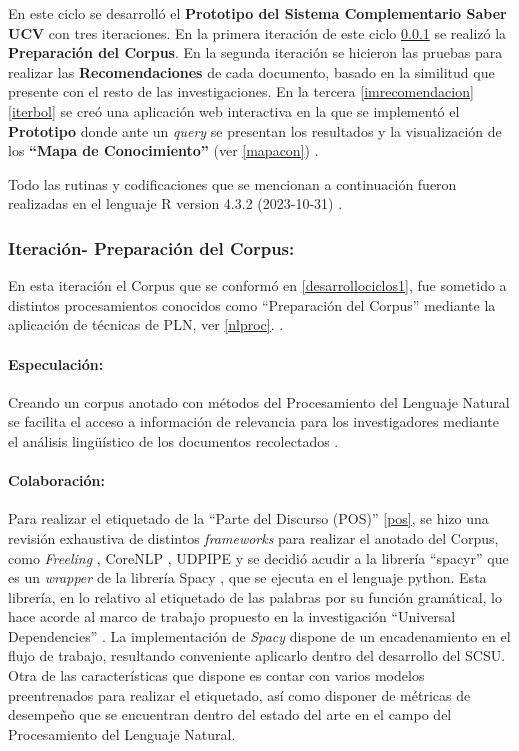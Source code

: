 \documentclass[
  12pt,
  openany]{book}
\begin{document}
En este ciclo se desarrolló el \textbf{Prototipo del Sistema Complementario Saber UCV} con tres iteraciones. En la primera iteración de este ciclo \ref{iternlp} se realizó la \textbf{Preparación del Corpus}. En la segunda iteración se hicieron las pruebas para realizar las \textbf{Recomendaciones} de cada documento, basado en la similitud que presente con el resto de las investigaciones. En la tercera \ref{imrecomendacion} \ref{iterbol} se creó una aplicación web interactiva en la que se implementó el \textbf{Prototipo} donde ante un \emph{query} se presentan los resultados y la visualización de los \textbf{``Mapa de Conocimiento''} (ver \ref{mapacon}) .

Todo las rutinas y codificaciones que se mencionan a continuación fueron realizadas en el lenguaje R version 4.3.2 (2023-10-31) \citep{R}.

\hypertarget{iternlp}{%
\subsubsection{Iteración- Preparación del Corpus:}\label{iternlp}}

En esta iteración el Corpus que se conformó en \ref{desarrollociclos1}, fue sometido a distintos procesamientos conocidos como ``Preparación del Corpus'' mediante la aplicación de técnicas de PLN, ver \ref{nlproc}. .

\hypertarget{especulaciuxf3n-4}{%
\paragraph{Especulación:}\label{especulaciuxf3n-4}}

Creando un corpus anotado con métodos del Procesamiento del Lenguaje Natural se facilita el acceso a información de relevancia para los investigadores mediante el análisis lingüístico de los documentos recolectados \citep{article}.

\hypertarget{colaboraciuxf3n-4}{%
\paragraph{Colaboración:}\label{colaboraciuxf3n-4}}

Para realizar el etiquetado de la ``Parte del Discurso (POS)'' \ref{pos}, se hizo una revisión exhaustiva de distintos \emph{frameworks} para realizar el anotado del Corpus, como \emph{Freeling} \citep{padro12}, CoreNLP \citep{manning-etal-2014-stanford}, UDPIPE \citep{udpipe-2} y se decidió acudir a la librería ``spacyr'' \citep{spacyr} que es un \emph{wrapper} de la librería Spacy \citep{spacy2020}, que se ejecuta en el lenguaje python. Esta librería, en lo relativo al etiquetado de las palabras por su función gramátical, lo hace acorde al marco de trabajo propuesto en la investigación ``Universal Dependencies'' \citep{demarneffe2021}. La implementación de \emph{Spacy} dispone de un encadenamiento en el flujo de trabajo, resultando conveniente aplicarlo dentro del desarrollo del SCSU. Otra de las características que dispone es contar con varios modelos preentrenados para realizar el etiquetado, así como disponer de métricas de desempeño que se encuentran dentro del estado del arte en el campo del Procesamiento del Lenguaje Natural.
\end{document}
